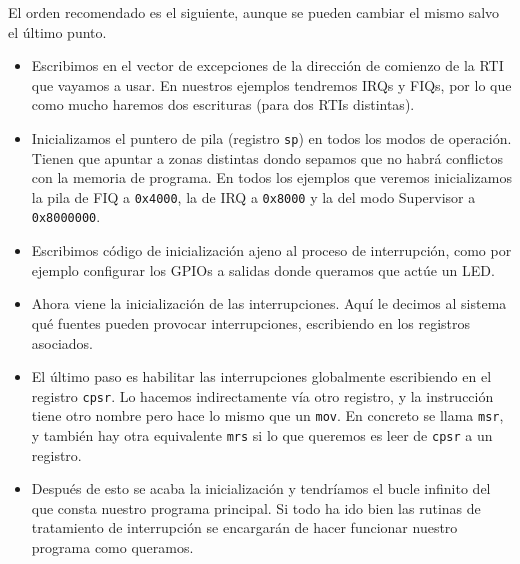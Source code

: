 El orden recomendado es el siguiente, aunque se pueden cambiar el mismo salvo el último punto.

\begin{itemize}
  \item Escribimos en el vector de excepciones de la dirección de comienzo de la RTI que vayamos
        a usar. En nuestros ejemplos tendremos IRQs y FIQs, por lo que como mucho haremos dos
        escrituras (para dos RTIs distintas).
  \item Inicializamos el puntero de pila (registro {\tt sp}) en todos los modos de operación.
        Tienen que apuntar a zonas distintas dondo sepamos que no habrá conflictos con la
        memoria de programa. En todos los ejemplos que veremos inicializamos la pila de FIQ
        a {\tt 0x4000}, la de IRQ a {\tt 0x8000} y la del modo Supervisor a {\tt 0x8000000}.
  \item Escribimos código de inicialización ajeno al proceso de interrupción, como por ejemplo
        configurar los GPIOs a salidas donde queramos que actúe un LED.
  \item Ahora viene la inicialización de las interrupciones. Aquí le decimos al sistema qué fuentes
        pueden provocar interrupciones, escribiendo en los registros asociados. 
  \item El último paso es habilitar las interrupciones globalmente escribiendo en el registro
        {\tt cpsr}. Lo hacemos indirectamente vía otro registro, y la instrucción tiene otro
        nombre pero hace lo mismo que un {\tt mov}. En concreto se llama {\tt msr}, y también hay
        otra equivalente {\tt mrs} si lo que queremos es leer de {\tt cpsr} a un registro.
  \item Después de esto se acaba la inicialización y tendríamos el bucle infinito del que consta
        nuestro programa principal. Si todo ha ido bien las rutinas de tratamiento de interrupción
        se encargarán de hacer funcionar nuestro programa como queramos.
\end{itemize}






\chapterend{}

